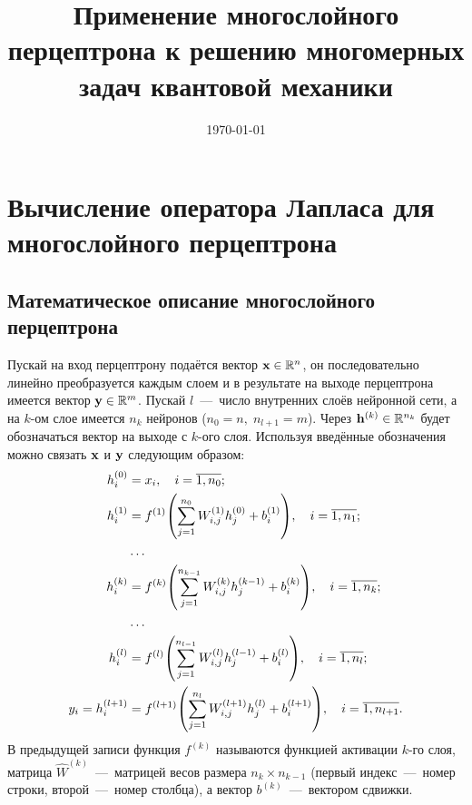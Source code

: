 \documentclass[11pt]{article}
\title{Применение многослойного перцептрона к решению многомерных задач квантовой механики}
\date{\today}
\begin{document}
\maketitle

\section{Вычисление оператора Лапласа для многослойного перцептрона}

\subsection{Математическое описание многослойного перцептрона}

Пускай на вход перцептрону подаётся вектор $\vb{x}\in\mathbb{R}^n$, он последовательно линейно преобразуется каждым слоем и в результате на выходе перцептрона имеется вектор $\vb{y}\in\mathbb{R}^m$. Пускай $l$~---~число внутренних слоёв нейронной сети, а на $k$-ом слое имеется $n_k$ нейронов ($n_0=n,\; n_{l+1}=m$). Через $\vb{h}^{(k)}\in\mathbb{R}^{n_k}$ будет обозначаться вектор на выходе с $k$-ого слоя. Используя введённые обозначения можно связать $\vb{x}$ и $\vb{y}$ следующим образом:
\begin{equation}
    \begin{split}
        h^{(0)}_i &= x_i,\quad i=\overline{1,n_0};\\
        h^{(1)}_i &= f^{(1)}\qty(\sum_{j=1}^{n_0} W^{(1)}_{i,j} h^{(0)}_j + b^{(1)}_i),\quad i=\overline{1,n_1};\\
        & \ldots\\
        h^{(k)}_i &= f^{(k)}\qty(\sum_{j=1}^{n_{k-1}} W^{(k)}_{i,j} h^{(k-1)}_j + b^{(k)}_i),\quad i=\overline{1,n_k};\\
        & \ldots\\
        h^{(l)}_i &= f^{(l)}\qty(\sum_{j=1}^{n_{l-1}} W^{(l)}_{i,j} h^{(l-1)}_j + b^{(l)}_i),\quad i=\overline{1,n_l};\\
        y_i = h^{(l+1)}_i &= f^{(l+1)}\qty(\sum_{j=1}^{n_{l}} W^{(l+1)}_{i,j} h^{(l)}_j + b^{(l+1)}_i),\quad i=\overline{1,n_{l+1}}.
    \end{split}
    \label{eq:perc}
\end{equation}
В предыдущей записи функция $f^{(k)}$ называются функцией активации $k$-го слоя, матрица $\hat W^{(k)}$~---~матрицей весов размера $n_k \times n_{k-1}$ (первый индекс~---~номер строки, второй~---~номер столбца), а вектор $b^{(k)}$~---~вектором сдвижки.
\end{document}
